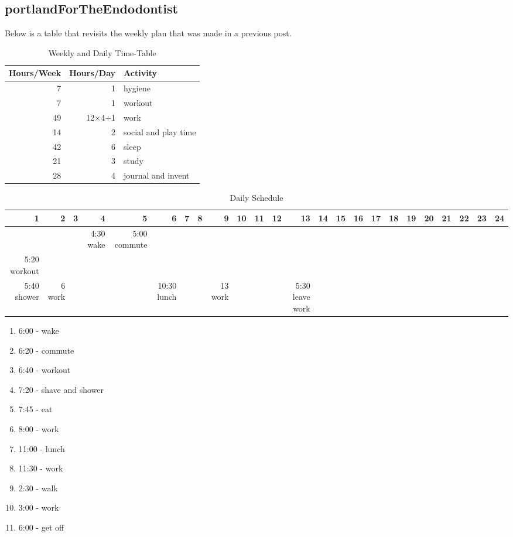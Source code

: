\begin{enumerate}
\subsection*{portlandForTheEndodontist}

Below is a table that revisits the weekly plan that was made in a previous post.

\begin{table}
\caption{\label{tab:2016.06.01WeeklyAndDailyTimeTable}Weekly and Daily Time-Table}
\begin{tabular}{|r|r|l|}
\hline
Hours/Week&Hours/Day&Activity\\
\hline
7&1&hygiene\\
7&1&workout\\
49&12$\times$4+1&work\\
14&2&social and play time\\
42&6&sleep\\
21&3&study\\
28&4&journal and invent\\
\hline
\end{tabular}\end{table}

\begin{table}
\caption{\label{tab:2016.06.01DailySchedule}Daily Schedule}
\begin{tabular}{|r|r|r|r|r|r|r|r|r|r|r|r|r|r|r|r|r|r|r|r|r|r|r|r|}
\hline
1&2&3&4&5&6&7&8&9&10&11&12&13&14&15&16&17&18&19&20&21&22&23&24\\
\hline
&&&4:30 wake&5:00 commute\\5:20 workout\\5:40 shower&6 work&&&&10:30 lunch&&&13 work&&&&5:30 leave work&&&&&&&\\
\hline
\end{tabular}\end{table}

\begin{enumerate}
\item 6:00 - wake
\item 6:20 - commute
\item 6:40 - workout
\item 7:20 - shave and shower
\item 7:45 - eat
\item 8:00 - work
\item 11:00 - lunch
\item 11:30 - work
\item 2:30 - walk
\item 3:00 - work
\item 6:00 - get off
\end{enumerate}


\end{enumerate}
